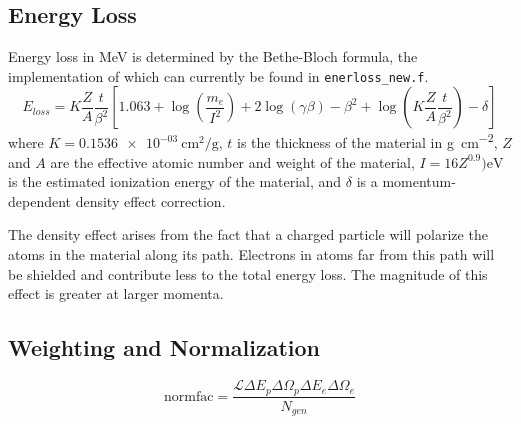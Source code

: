 \subsection{Energy Loss}
Energy loss in \si{\mega\electronvolt} is determined by the Bethe-Bloch formula,
the implementation of which can currently be found in \texttt{enerloss\_new.f}.
\begin{equation}
 E_{loss} =  K \frac{Z}{A} \frac{t}{\beta^2}
             \left[
                1.063
                + \log\left(\frac{m_e}{I^2}\right)
                + 2 \log(\gamma\beta)
                - \beta^2
                + \log\left(K\frac{Z}{A}\frac{t}{\beta^2}\right)
                - \delta
             \right]
\end{equation}
where
$K=\SI{0.1536e-03}{\centi\meter\squared\per\gram}$,
$t$ is the thickness of the material in \si{\gram\per\centi\meter\squared},
$Z$ and $A$ are the effective atomic number and weight of the material,
$I=16 Z^{0.9}) \si{\electronvolt}$ is the estimated ionization energy of the material,
and $\delta$ is a momentum-dependent density effect correction.

The density effect arises from the fact that a charged particle will polarize
the atoms in the material along its path.
Electrons in atoms far from this path will be shielded and contribute less to
the total energy loss.
The magnitude of this effect is greater at larger momenta.

\subsection{Weighting and Normalization}
\begin{equation}
    \text{normfac} = \frac{\mathcal{L} \Delta E_p \Delta \Omega_p \Delta E_e \Delta \Omega_e}
                          {N_{gen}}
\end{equation}



